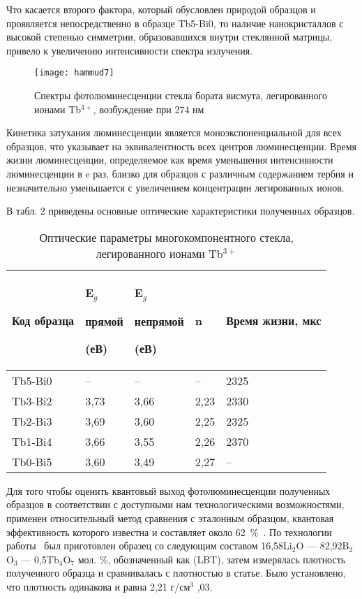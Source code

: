 \documentclass[press]{vestnik}
\begin{document}
Что касается второго фактора, который обусловлен природой образцов и 
проявляется непосредственно в образце Tb5-Bi0, то наличие нанокристаллов с 
высокой степенью симметрии, образовавшихся внутри стеклянной матрицы, 
привело к увеличению интенсивности спектра излучения.

\begin{figure}
\centerline{\texttt{[image: hammud7]}}
\caption{Спектры фотолюминесценции стекла бората висмута, легированного 
ионами Tb$^{3+}$, возбуждение при 274 нм}
\label{fig7}
\end{figure}

Кинетика затухания люминесценции является моноэкспоненциальной для всех 
образцов, что указывает на эквивалентность всех центров люминесценции. Время 
жизни люминесценции, определяемое как время уменьшения интенсивности 
люминесценции в e раз, близко для образцов с различным содержанием тербия и 
незначительно уменьшается с увеличением концентрации легированных ионов.

В табл. 2 приведены основные оптические характеристики полученных 
образцов.

\begin{table}
\caption{Оптические параметры многокомпонентного стекла, легированного 
ионами Tb$^{3+}$}
\begin{tabularx}{\textwidth}{|Y|Y|Y|Y|Y|}
\hline
Код образца& 
E$_{g}$ \par прямой \par (еВ)& 
E$_{g}$ \par непрямой \par (еВ)& 
n& 
Время жизни, мкс \\
\hline
Tb5-Bi0& 
--& 
--& 
--& 
2325 \\
\hline
Tb3-Bi2& 
3,73& 
3,66& 
2,23& 
2330 \\
\hline
Tb2-Bi3& 
3,69& 
3,60& 
2,25& 
2325 \\
\hline
Tb1-Bi4& 
3,66& 
3,55& 
2,26& 
2370 \\
\hline
Tb0-Bi5& 
3,60& 
3,49& 
2,27& 
-- \\
\hline
\end{tabularx}
\label{tab2}
\end{table}

Для того чтобы оценить квантовый выход фотолюминесценции полученных образцов 
в соответствии с доступными нам технологическими возможностями, применен 
относительный метод сравнения с эталонным образцом, квантовая эффективность 
которого известна и составляет около 62~{\%}~\cite{B22}. По технологии работы~\cite{B22} 
был приготовлен образец со следующим составом 16,58Li$_{2}$O ---
82,92B$_{2}$O$_{3}$ --- 0,5Tb$_{4}$O$_{7}$ мол. {\%}, обозначенный как (LBT), 
затем измерялась плотность полученного образца и сравнивалась с плотностью в 
статье. Было установлено, что плотность одинакова и равна 2,21 г/см$^{3}$ 
,03.
\end{document}
